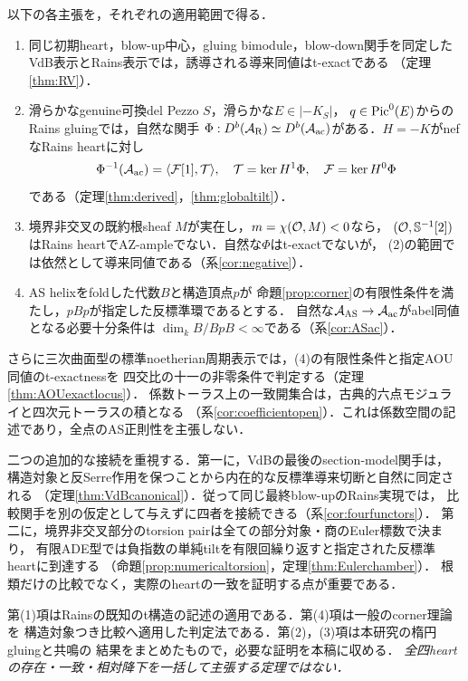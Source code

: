 \begin{theorem}[比較定理の要約]\label{thm:summary}
以下の各主張を，それぞれの適用範囲で得る．
\begin{enumerate}
\item 同じ初期heart，blow-up中心，gluing bimodule，blow-down関手を同定した
VdB表示とRains表示では，誘導される導来同値はt-exactである
（定理\ref{thm:RV}）．
\item 滑らかなgenuine可換del Pezzo $S$，滑らかな$E\in|-K_S|$，
$q\in\operatorname{Pic}^0(E)$からのRains gluingでは，自然な関手
$\Phi:D^b(\mathcal A_{\mathrm R})\simeq D^b(\mathcal A_{\mathrm{ac}})$がある．$H=-K$がnefなRains heartに対し
\[
\Phi^{-1}(\mathcal A_{\mathrm{ac}})=\langle\mathcal F[1],\mathcal T\rangle,
\quad \mathcal T=\ker H^1\Phi,\quad\mathcal F=\ker H^0\Phi
\]
である（定理\ref{thm:derived}，\ref{thm:globaltilt}）．
\item 境界非交叉の既約根sheaf $M$が実在し，$m=\chi(\mathcal O,M)<0$なら，
$(\mathcal O,\mathbb S^{-1}[2])$はRains heartでAZ-ampleでない．自然な$\Phi$はt-exactでないが，
(2)の範囲では依然として導来同値である（系\ref{cor:negative}）．
\item AS helixをfoldした代数$B$と構造頂点$p$が
命題\ref{prop:corner}の有限性条件を満たし，$pBp$が指定した反標準環であるとする．
自然な$\mathcal A_{\mathrm{AS}}\to\mathcal A_{\mathrm{ac}}$がabel同値となる必要十分条件は
$\dim_k B/BpB<\infty$である（系\ref{cor:ASac}）．
\end{enumerate}
\end{theorem}
さらに三次曲面型の標準noetherian周期表示では，(4)の有限性条件と指定AOU同値のt-exactnessを
四交比の十一の非零条件で判定する（定理\ref{thm:AOUexactlocus}）．
係数トーラス上の一致開集合は，古典的六点モジュライと四次元トーラスの積となる
（系\ref{cor:coefficientopen}）．これは係数空間の記述であり，全点のAS正則性を主張しない．

二つの追加的な接続を重視する．第一に，VdBの最後のsection-model関手は，
構造対象と反Serre作用を保つことから内在的な反標準導来切断と自然に同定される
（定理\ref{thm:VdBcanonical}）．従って同じ最終blow-upのRains実現では，
比較関手を別の仮定として与えずに四者を接続できる（系\ref{cor:fourfunctors}）．
第二に，境界非交叉部分のtorsion pairは全ての部分対象・商のEuler標数で決まり，
有限ADE型では負指数の単純tiltを有限回繰り返すと指定された反標準heartに到達する
（命題\ref{prop:numericaltorsion}，定理\ref{thm:Eulerchamber}）．
根類だけの比較でなく，実際のheartの一致を証明する点が重要である．

第(1)項はRainsの既知のt構造の記述の適用である．第(4)項は一般のcorner理論を
構造対象つき比較へ適用した判定法である．第(2)，(3)項は本研究の楕円gluingと共鳴の
結果をまとめたもので，必要な証明を本稿に収める．
\emph{全四heartの存在・一致・相対降下を一括して主張する定理ではない．}

